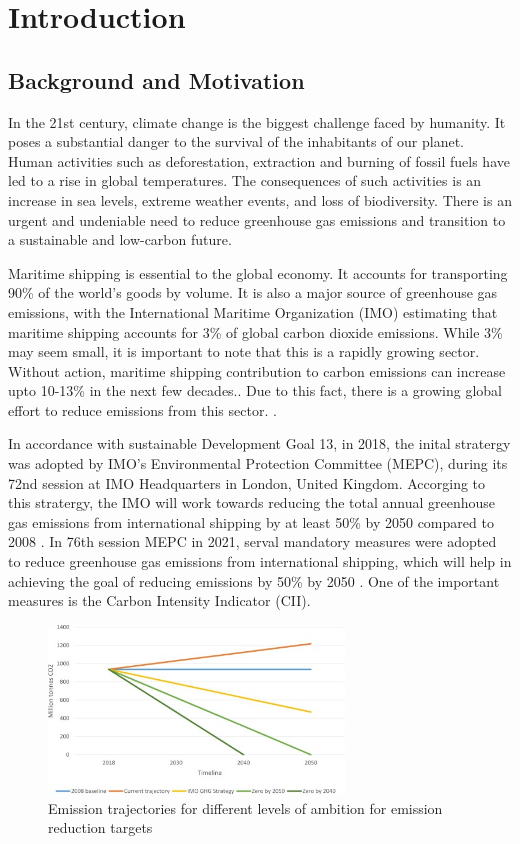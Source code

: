 \chapter{Introduction}
\setcounter{page}{1}

\section{Background and Motivation}

In the 21st century, climate change is the biggest challenge faced by humanity. It poses a substantial danger to the survival of the inhabitants of our planet.
Human activities such as deforestation, extraction and burning of fossil fuels have led to a rise in global temperatures.
The consequences of such activities is an increase in sea levels, extreme weather events, and loss of biodiversity.
There is an urgent and undeniable need to reduce greenhouse gas emissions and transition to a sustainable and low-carbon future.

Maritime shipping is essential to the global economy. It accounts for transporting 90\% of the world's goods by volume.
It is also a major source of greenhouse gas emissions, with the International Maritime Organization (IMO)
estimating that maritime shipping accounts for 3\% of global carbon dioxide emissions.
While 3\% may seem small, it is important to note that this is a rapidly growing sector.
Without action, maritime shipping contribution to carbon emissions can increase upto 10-13\% in the next few decades..
Due to this fact, there is a growing global effort to reduce emissions from this sector. \autocite{king_anthony_2022}.

In accordance with sustainable Development Goal 13, in 2018, the inital stratergy was adopted by IMO's Environmental Protection Committee (MEPC),
during its 72nd session at IMO Headquarters in London, United Kingdom. Accorging to this stratergy,
the IMO will work towards reducing the total annual greenhouse gas emissions from international shipping by at least 50\% by 2050 compared to 2008 \autocite{imo-2018}.
In 76th session MEPC in 2021, serval mandatory measures were adopted to reduce greenhouse gas emissions from international shipping,
which will help in achieving the goal of reducing emissions by 50\% by 2050 \autocite{imo-2021}. One of the important measures is the Carbon Intensity Indicator (CII).

\begin{figure}[ht]
    \centering
    \includegraphics[width=0.7\textwidth]{images/emission_trajactory.jpg}
    \caption{Emission trajectories for different levels of ambition for emission reduction targets}
    \label{emissionTrajectory}
\end{figure}


